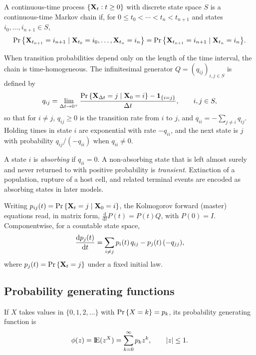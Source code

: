 \begin{definition}[CTMC]
A continuous-time process \(\{{\bf X}_t:t\ge0\}\) with discrete state space \(S\) is a continuous-time Markov chain if, for \(0\le t_0<\cdots<t_n<t_{n+1}\) and states \(i_0,\dots,i_{n+1}\in S\),
\begin{equation*}
{\text{Pr}\left\{{\bf X}_{t_{n+1}}=i_{n+1}\mid {\bf X}_{t_0}=i_0,\dots,{\bf X}_{t_n}=i_n\right\}}
={\text{Pr}\left\{{\bf X}_{t_{n+1}}=i_{n+1}\mid {\bf X}_{t_n}=i_n\right\}}.
\end{equation*}
\end{definition}

When transition probabilities depend only on the length of the time interval, the chain is time-homogeneous. The infinitesimal generator \(Q=(q_{ij})_{i,j\in S}\) is defined by
\begin{equation*}
q_{ij}=\lim_{\Delta t\to0^+}\frac{{\text{Pr}\left\{{\bf X}_{\Delta t}=j\mid {\bf X}_0=i\right\}}-\mathbf{1}_{\{i=j\}}}{\Delta t},
\qquad i,j\in S,
\end{equation*}
so that for \(i\neq j\), \(q_{ij}\ge0\) is the transition rate from \(i\) to \(j\), and \(q_{ii}=-\sum_{j\neq i}q_{ij}\). Holding times in state \(i\) are exponential with rate \(-q_{ii}\), and the next state is \(j\) with probability \(q_{ij}/(-q_{ii})\) when \(q_{ii}\neq0\).

\begin{definition}
A state \(i\) is \emph{absorbing} if \(q_{ii}=0\). A non-absorbing state that is left almost surely and never returned to with positive probability is \emph{transient}. Extinction of a population, rupture of a host cell, and related terminal events are encoded as absorbing states in later models.
\end{definition}

Writing \(p_{ij}(t)={\text{Pr}\left\{{\bf X}_t=j\mid {\bf X}_0=i\right\}}\), the Kolmogorov forward (master) equations read, in matrix form, \(\frac{\mathrm{d}}{\mathrm{d}t}P(t)=P(t)Q\), with \(P(0)=I\). Componentwise, for a countable state space,
\begin{equation}
\label{eq:master}
\displaystyle\frac{{\rm d} p_j(t)}{{\rm d} t} = \sum_{i\neq j} p_i(t)\,q_{ij} - p_j(t)\,(-q_{jj}),
\end{equation}
where \(p_j(t)={\text{Pr}\left\{{\bf X}_t=j\right\}}\) under a fixed initial law.

\subsection{Probability generating functions}
\label{sec:pgf}

\begin{definition}
If \(X\) takes values in \(\{0,1,2,\dots\}\) with \({\text{Pr}\left\{X=k\right\}}=p_k\), its probability generating function is
\begin{equation}
\label{eq:pgf-uni}
\phi(z)={\rm I}\!{\rm E}(z^X)=\sum_{k=0}^{\infty}p_k z^k,\qquad |z|\le1.
\end{equation}
\end{definition}

